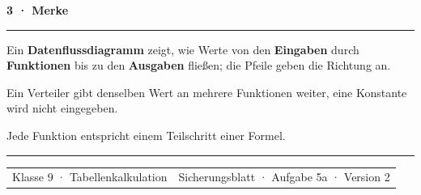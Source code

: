\documentclass[10pt,a4paper]{article}
\newcommand{\sectiontitle}[1]{%
  \vspace{2.3mm}
  {\color{Blue}\bfseries\large #1}\par
  \vspace{0.8mm}
  {\color{Blue}\rule{\linewidth}{0.7pt}}\par
  \vspace{1.2mm}
}
\begin{document}
\sectiontitle{3 · Merke}

\begin{tcolorbox}[colback=Mint,colframe=Blue!40,arc=3mm,boxrule=0.7pt,
  left=3mm,right=3mm,top=2mm,bottom=2mm]
  Ein \textbf{Datenflussdiagramm} zeigt, wie Werte von den \textbf{Eingaben}
  durch \textbf{Funktionen} bis zu den \textbf{Ausgaben} fließen; die Pfeile
  geben die Richtung an.\par
  \vspace{1.2mm}
  Ein Verteiler gibt denselben Wert an mehrere Funktionen weiter, eine
  Konstante wird nicht eingegeben.\par
  \vspace{1.2mm}
  Jede Funktion entspricht einem Teilschritt einer Formel.
\end{tcolorbox}

\vfill
{\color{Line}\rule{\linewidth}{0.5pt}}\par
\vspace{1.5mm}
\begin{tabularx}{\linewidth}{@{}Xr@{}}
  {\small\color{Muted}Klasse 9 · Tabellenkalkulation} &
  {\small\color{Muted}Sicherungsblatt · Aufgabe 5a · Version 2}
\end{tabularx}
\end{document}
